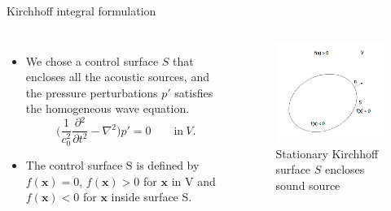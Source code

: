 \documentclass[10pt, aspectratio=169]{beamer}
\begin{document}
\begin{frame}{Kirchhoff integral formulation}
	\begin{columns}
		\begin{itemize}
			\item We chose a control surface $S$ that encloses all the acoustic sources, and the pressure perturbations $p'$ satisfies the homogeneous wave equation.
			\begin{equation}\label{Wave equation}
				\Bigg( \frac{1}{c_{0}^2}\frac{\partial{}^{2}}{\partial{t}^{2}}- \nabla{}^{2} \Bigg) p' = 0 \quad \quad \textrm{in} \ V.
			\end{equation}
			\item The control surface S is defined by $f(\mathbf{x}) = 0$, $f(\mathbf{x}) > 0$ for $\mathbf{x}$ in V and $f(\mathbf{x}) < 0$ for $\mathbf{x}$ inside surface S.
		\end{itemize}
				
		\begin{figure}[h]
			\includegraphics[scale = 0.3]{images/kirchhoff_surface.png}
			\caption*{Stationary Kirchhoff surface $S$ encloses sound source}	
		\end{figure}
							
	\end{columns}
\end{frame}
\end{document}
